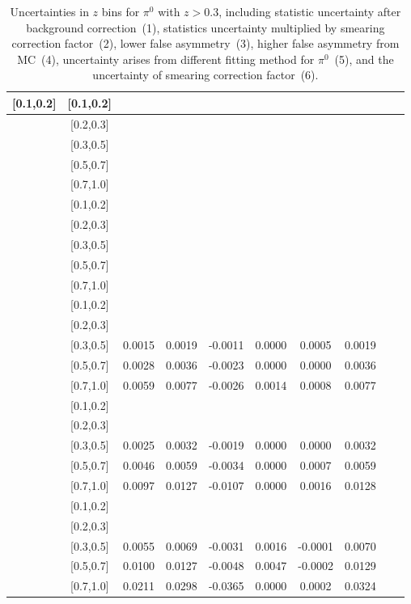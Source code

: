 \begin{table}[H]
\begin{tabular}{|c| c| c| c| c| c| c| c| c| c|}
[0.1,0.2]	&	[0.1,0.2]	&		&		&		&		&		&		\\ \hline
[0.1,0.2]	&	[0.2,0.3]	&		&		&		&		&		&		\\ \hline
[0.1,0.2]	&	[0.3,0.5]	&		&		&		&		&		&		\\ \hline
[0.1,0.2]	&	[0.5,0.7]	&		&		&		&		&		&		\\ \hline
[0.1,0.2]	&	[0.7,1.0]	&		&		&		&		&		&		\\ \hline
[0.2,0.3]	&	[0.1,0.2]	&		&		&		&		&		&		\\ \hline
[0.2,0.3]	&	[0.2,0.3]	&		&		&		&		&		&		\\ \hline
[0.2,0.3]	&	[0.3,0.5]	&		&		&		&		&		&		\\ \hline
[0.2,0.3]	&	[0.5,0.7]	&		&		&		&		&		&		\\ \hline
[0.2,0.3]	&	[0.7,1.0]	&		&		&		&		&		&		\\ \hline
[0.3,0.5]	&	[0.1,0.2]	&		&		&		&		&		&		\\ \hline
[0.3,0.5]	&	[0.2,0.3]	&		&		&		&		&		&		\\ \hline
[0.3,0.5]	&	[0.3,0.5]	&	0.0015	&	0.0019	&	-0.0011	&	0.0000	&	0.0005	&	0.0019	\\ \hline
[0.3,0.5]	&	[0.5,0.7]	&	0.0028	&	0.0036	&	-0.0023	&	0.0000	&	0.0000	&	0.0036	\\ \hline
[0.3,0.5]	&	[0.7,1.0]	&	0.0059	&	0.0077	&	-0.0026	&	0.0014	&	0.0008	&	0.0077	\\ \hline
[0.5,0.7]	&	[0.1,0.2]	&		&		&		&		&		&		\\ \hline
[0.5,0.7]	&	[0.2,0.3]	&		&		&		&		&		&		\\ \hline
[0.5,0.7]	&	[0.3,0.5]	&	0.0025	&	0.0032	&	-0.0019	&	0.0000	&	0.0000	&	0.0032	\\ \hline
[0.5,0.7]	&	[0.5,0.7]	&	0.0046	&	0.0059	&	-0.0034	&	0.0000	&	0.0007	&	0.0059	\\ \hline
[0.5,0.7]	&	[0.7,1.0]	&	0.0097	&	0.0127	&	-0.0107	&	0.0000	&	0.0016	&	0.0128	\\ \hline
[0.7,1.0]	&	[0.1,0.2]	&		&		&		&		&		&		\\ \hline
[0.7,1.0]	&	[0.2,0.3]	&		&		&		&		&		&		\\ \hline
[0.7,1.0]	&	[0.3,0.5]	&	0.0055	&	0.0069	&	-0.0031	&	0.0016	&	-0.0001	&	0.0070	\\ \hline
[0.7,1.0]	&	[0.5,0.7]	&	0.0100	&	0.0127	&	-0.0048	&	0.0047	&	-0.0002	&	0.0129	\\ \hline
[0.7,1.0]	&	[0.7,1.0]	&	0.0211	&	0.0298	&	-0.0365	&	0.0000	&	0.0002	&	0.0324	\\ \hline
\end{tabular}
\caption{Uncertainties in $z$ bins for $\pi^0$ with $z>0.3$, including statistic uncertainty after background correction~(1), statistics uncertainty multiplied by smearing correction factor~(2), lower false asymmetry~(3), higher false asymmetry from MC~(4), uncertainty arises from different fitting method for $\pi^0$~(5), and the uncertainty of smearing correction factor~(6).}
\label{tab:pi0foretaerrors_z}
\end{table}

